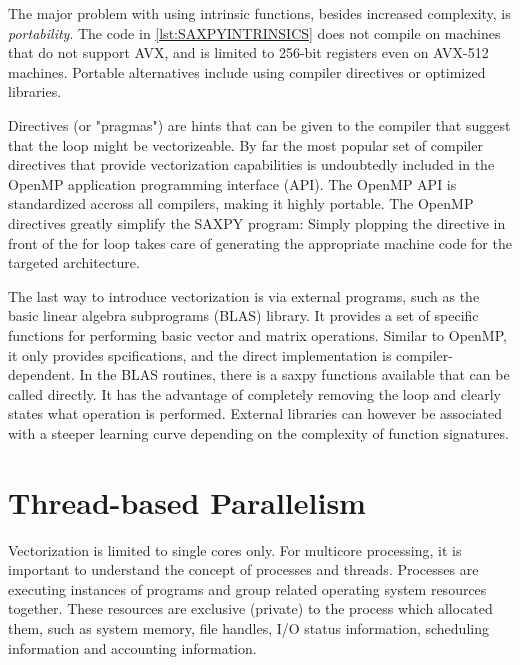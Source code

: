 The major problem with using intrinsic functions, besides increased complexity, is \emph{portability}. The code in \ref{lst:SAXPYINTRINSICS} does not compile on machines that do not support AVX, and is limited to 256-bit registers even on AVX-512 machines. Portable alternatives include using compiler directives or optimized libraries.

Directives (or "pragmas") are hints that can be given to the compiler that suggest that the loop might be vectorizeable. By far the most popular set of compiler directives that provide vectorization capabilities is undoubtedly included in the OpenMP application programming interface (API). The OpenMP API is standardized accross all compilers, making it highly portable. The OpenMP directives greatly simplify the SAXPY program:
\noindent Simply plopping the directive in front of the for loop takes care of generating the appropriate machine code for the targeted architecture. 

The last way to introduce vectorization is via external programs, such as the basic linear algebra subprograms (BLAS) library. It provides a set of specific functions for performing basic vector and matrix operations. Similar to OpenMP, it only provides spcifications, and the direct implementation is compiler-dependent. In the BLAS routines, there is a saxpy functions available that can be called directly. It has the advantage of completely removing the loop and clearly states what operation is performed.
\noindent External libraries can however be associated with a steeper learning curve depending on the complexity of function signatures.

\section{Thread-based Parallelism}

Vectorization is limited to single cores only. For multicore processing, it is important to understand the concept of processes and threads. Processes are executing instances of programs and group related operating system resources together. These resources are exclusive (private) to the process which allocated them, such as system memory, file handles, I/O status information, scheduling information and accounting information. 

